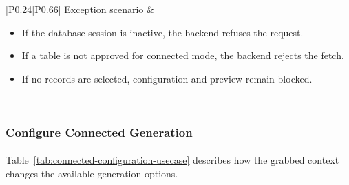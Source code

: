 \begin{longtable}{|P{0.24\linewidth}|P{0.66\linewidth}|}
\hline
Exception scenario &
\begin{itemize}[leftmargin=*,nosep]
    \item If the database session is inactive, the backend refuses the request.
    \item If a table is not approved for connected mode, the backend rejects the fetch.
    \item If no records are selected, configuration and preview remain blocked.
\end{itemize} \\
\hline
\end{longtable}
\renewcommand{\arraystretch}{1}

\subsubsection{Configure Connected Generation}

\paragraph{}Table~\ref{tab:connected-configuration-usecase} describes how the grabbed context changes
the available generation options.

